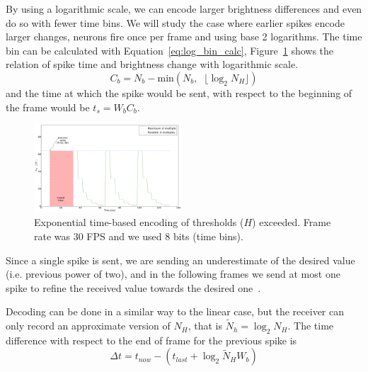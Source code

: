 \documentclass[conference]{IEEEtran}
\begin{document}
By using a logarithmic scale, we can encode larger brightness differences and even do so with fewer time bins. We will study the case where earlier spikes encode larger changes, neurons fire once per frame and using base 2 logarithms. 
The time bin can be calculated with Equation~\ref{eq:log_bin_calc}, Figure~\ref{fig:exponential_time} shows the relation of spike time and brightness change with logarithmic scale.
\begin{equation}
\label{eq:log_bin_calc}
C_{b} = N_{b} - \mathrm{min}\left( N_{b}, \;\; \lfloor\log_{2} N_{H}\rfloor \right) 
\end{equation}
and the time at which the spike would be sent, with respect to the beginning of the frame would be $t_{s} = W_{b}C_{b}$.
\begin{figure}[htb]
  \centering
  \includegraphics[width=0.49\textwidth]{spike_values_exp}

  \caption{Exponential time-based encoding of thresholds ($H$) exceeded. Frame rate was 30 FPS and we used 8 bits (time bins). }
  \label{fig:exponential_time}
\end{figure} 

Since a single spike is sent, we are sending an underestimate of the desired value (i.e. previous power of two), and in the following frames we send at most one spike to refine the received value towards the desired one~\cite{sardac}. 

Decoding can be done in a similar way to the linear case, but the receiver can only record an approximate version of $N_{H}$, that is $\tilde{N}_{h} = \log_2 N_{H}$. The time difference with respect to the end of frame for the previous spike is
\begin{equation}
\Delta t = t_{now} - \left( t_{last} + \log_{2}\tilde{N}_{H}W_{b} \right)
\label{eq:time_diff_exp}
\end{equation}
\end{document}
